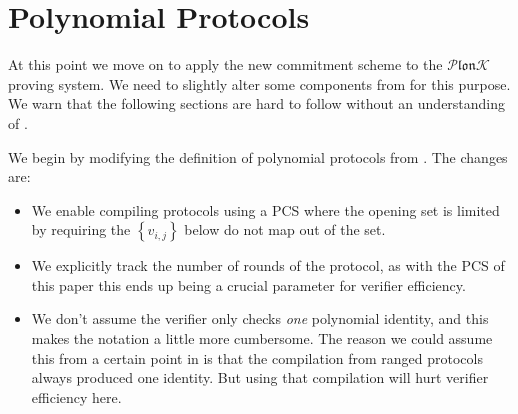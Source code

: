 \documentclass[11pt]{article} %
\newcommand{\set}[1]{\ensuremath{\left\{#1\right\}}\xspace}
\newcommand{\plonk}{\ensuremath{\mathcal{P} \mathfrak{lon}\mathcal{K}}\xspace}
\begin{document}
\section{Polynomial Protocols}
At this point we move on to apply the new commitment scheme to the \plonk proving system. We need to slightly alter some components from \cite{plonk} for this purpose.
We warn that the following sections are hard to follow without an understanding of \cite{plonk}.
    
We begin by modifying the definition of polynomial protocols from \cite{plonk}.
The changes are:
\begin{itemize}
 \item We enable compiling protocols using a PCS where the opening set is limited by requiring the \set{v_{i,j}} below do not map out of the set.
\item We explicitly track the number of rounds of the protocol,
as with the PCS of this paper this ends up being a crucial parameter for verifier efficiency. 
\item We don't assume the verifier only checks \textit{one} polynomial identity, and this makes the notation a little more cumbersome. The reason we could assume this from a certain point in \cite{plonk} is that the compilation from ranged protocols always produced one identity. But using that compilation will hurt verifier efficiency here.
\end{itemize}
\end{document}

